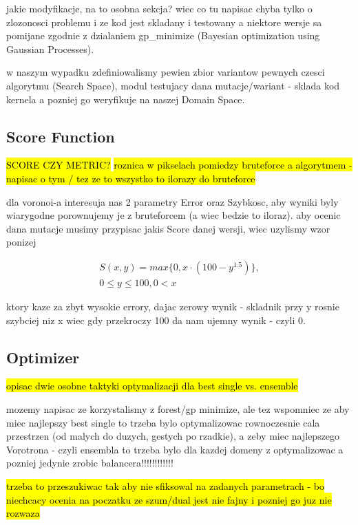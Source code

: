 \documentclass{article}
\begin{document}
jakie modyfikacje, na to osobna sekcja? wiec co tu napisac
chyba tylko o zlozonosci problemu i ze kod jest skladany i testowany a niektore
wersje sa pomijane zgodnie z dzialaniem gp\_minimize (Bayesian optimization
using Gaussian Processes).

w naszym wypadku zdefiniowalismy pewien zbior variantow pewnych czesci
algorytmu (Search Space), modul testujacy dana mutacje/wariant - sklada kod kernela a pozniej go weryfikuje na naszej Domain Space.

\subsection{Score Function} %

\hl{SCORE CZY METRIC?}
\hl{roznica w pikselach pomiedzy bruteforce a algorytmem - napisac o tym / tez
ze to wszystko to ilorazy do bruteforce}

dla voronoi-a interesuja nas 2 parametry Error oraz Szybkosc, aby wyniki byly
wiarygodne porownujemy je z bruteforcem (a wiec bedzie to iloraz).
aby ocenic dana mutacje musimy przypisac jakis Score danej wersji, wiec uzylismy
wzor ponizej

\begin{align}
S(x,y) = max\{0, x \cdot (100-y^{1.5})\}, \\
0 \leq y \leq 100, 0 < x
\end{align}

ktory kaze za zbyt wysokie errory, dajac zerowy wynik - skladnik przy y rosnie
szybciej niz x wiec gdy przekroczy 100 da nam ujemny wynik - czyli 0.

\subsection{Optimizer} %

\hl{opisac dwie osobne taktyki optymalizacji dla best single vs. ensemble}

mozemy napisac ze korzystalismy z forest/gp minimize, ale tez wspomniec ze aby
miec najlepszy best single to trzeba bylo optymalizowac rownoczesnie cala
przestrzen (od malych do duzych, gestych po rzadkie), a zeby miec najlepszego
Vorotrona - czyli ensembla to trzeba bylo dla kazdej domeny z optymalizowac a
pozniej jedynie zrobic balancera!!!!!!!!!!!!

\hl{trzeba to przeszukiwac tak aby nie sfiksowal na zadanych parametrach - bo
niechcacy ocenia na poczatku ze szum/dual jest nie fajny i pozniej go juz nie
rozwaza}
\end{document}
